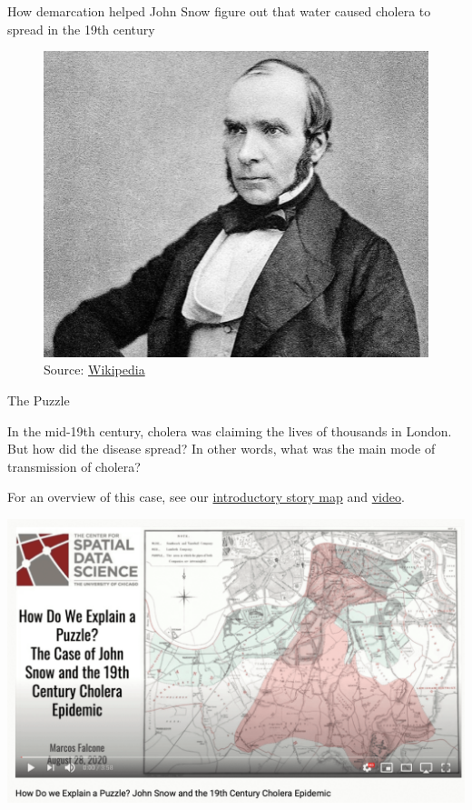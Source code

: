 \documentclass[
]{book}
\begin{document}
How demarcation helped John Snow figure out that water caused cholera to spread in the 19th century

\begin{figure}
\centering
\includegraphics{images/snow1.png}
\caption{Source: \href{https://en.wikipedia.org/wiki/John_Snow\#/media/File:John_Snow.jpg}{Wikipedia}}
\end{figure}

The Puzzle

In the mid-19th century, cholera was claiming the lives of thousands in London. But how did the disease spread? In other words, what was the main mode of transmission of cholera?

For an overview of this case, see our \href{https://uploads.knightlab.com/storymapjs/a0d512bc2bc17977f1029fedead0329a/trying-out/draft.html}{introductory story map} and \href{https://youtu.be/lGN8SK1Y1h4}{video}.

\includegraphics{images/snow2.png}
\end{document}
